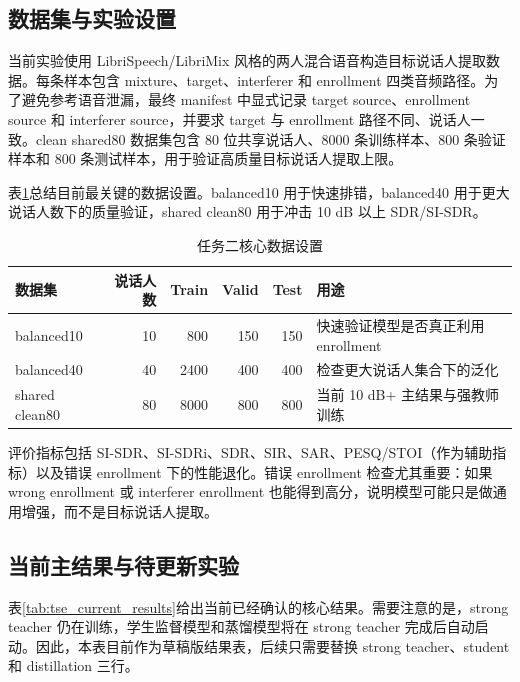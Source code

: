 \documentclass[UTF8,zihao=-4,a4paper]{ctexart}
\begin{document}
\subsection{数据集与实验设置}

当前实验使用 LibriSpeech/LibriMix 风格的两人混合语音构造目标说话人提取数据。每条样本包含 mixture、target、interferer 和 enrollment 四类音频路径。为了避免参考语音泄漏，最终 manifest 中显式记录 target source、enrollment source 和 interferer source，并要求 target 与 enrollment 路径不同、说话人一致。clean shared80 数据集包含 80 位共享说话人、8000 条训练样本、800 条验证样本和 800 条测试样本，用于验证高质量目标说话人提取上限。

表\ref{tab:tse_dataset_summary}总结目前最关键的数据设置。balanced10 用于快速排错，balanced40 用于更大说话人数下的质量验证，shared clean80 用于冲击 10 dB 以上 SDR/SI-SDR。

\begin{table}[htbp]
\centering
\begin{tabular}{lrrrrl}
\toprule
数据集 & 说话人数 & Train & Valid & Test & 用途 \\
\midrule
balanced10 & 10 & 800 & 150 & 150 & 快速验证模型是否真正利用 enrollment \\
balanced40 & 40 & 2400 & 400 & 400 & 检查更大说话人集合下的泛化 \\
shared clean80 & 80 & 8000 & 800 & 800 & 当前 10 dB+ 主结果与强教师训练 \\
\bottomrule
\end{tabular}
\caption{任务二核心数据设置}
\label{tab:tse_dataset_summary}
\end{table}

评价指标包括 SI-SDR、SI-SDRi、SDR、SIR、SAR、PESQ/STOI（作为辅助指标）以及错误 enrollment 下的性能退化。错误 enrollment 检查尤其重要：如果 wrong enrollment 或 interferer enrollment 也能得到高分，说明模型可能只是做通用增强，而不是目标说话人提取。

\subsection{当前主结果与待更新实验}

表\ref{tab:tse_current_results}给出当前已经确认的核心结果。需要注意的是，strong teacher 仍在训练，学生监督模型和蒸馏模型将在 strong teacher 完成后自动启动。因此，本表目前作为草稿版结果表，后续只需要替换 strong teacher、student 和 distillation 三行。
\end{document}
